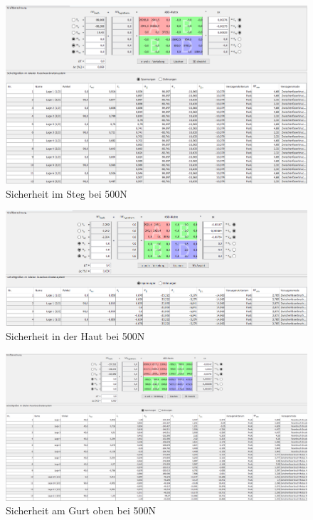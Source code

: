 \begin{figure}[h]
 \centering
 \includegraphics[width=1\textwidth]{Bilder/sicher1}
 \caption{Sicherheit im Steg bei 500N}
 \label{sicher-steg}
\end{figure}
\begin{figure}[h]
\centering
\includegraphics[width=1\textwidth]{Bilder/sicher2}
\caption{Sicherheit in der Haut bei 500N}
\end{figure}
\begin{figure}[h]
\centering
\includegraphics[width=1\textwidth]{Bilder/sicher3}
\caption{Sicherheit am Gurt oben bei 500N}
\end{figure}
